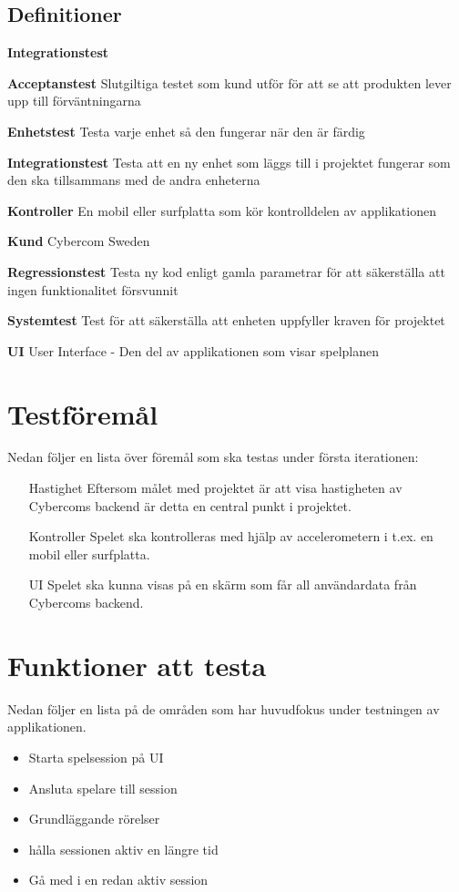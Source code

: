 \documentclass[10pt]{article}
\begin{document}
	\subsection{Definitioner}
  \begin{labeling}{\textbf{Integrationstest}}
  \item [\textbf{Acceptanstest}]Slutgiltiga testet som kund utför för att se att produkten lever upp till förväntningarna
    \item [\textbf{Enhetstest}] Testa varje enhet så den fungerar när den är färdig
    \item [\textbf{Integrationstest}] Testa att en ny enhet som läggs till i projektet fungerar som den ska tillsammans med de andra enheterna
    \item [\textbf{Kontroller}] En mobil eller surfplatta som kör kontrolldelen av applikationen
    \item [\textbf{Kund}] Cybercom Sweden
    \item [\textbf{Regressionstest}] Testa ny kod enligt gamla parametrar för att säkerställa att ingen funktionalitet försvunnit
    \item [\textbf{Systemtest}] Test för att säkerställa att enheten uppfyller kraven för projektet		
    \item [\textbf{UI}] User Interface - Den del av applikationen som visar spelplanen
  \end{labeling}

	
\section{Testföremål}
	Nedan följer en lista över föremål som ska testas under första iterationen:
	\begin{itemize}
	\item [Hastighet] Eftersom målet med projektet är att visa hastigheten av Cybercoms backend är detta en central punkt i projektet.
	\item [Kontroller] Spelet ska kontrolleras med hjälp av accelerometern i t.ex. en mobil eller surfplatta.
	\item [UI] Spelet ska kunna visas på en skärm som får all användardata från Cybercoms backend.
	\end{itemize}
	
	
	
	

\section{Funktioner att testa}
	Nedan följer en lista på de områden som har huvudfokus under testningen av applikationen.
	\begin{itemize}
	\item Starta spelsession på UI 
	\item Ansluta spelare till session
	\item Grundläggande rörelser
	\item hålla sessionen aktiv en längre tid
	\item Gå med i en redan aktiv session
	\end{itemize}
	
\end{document}
